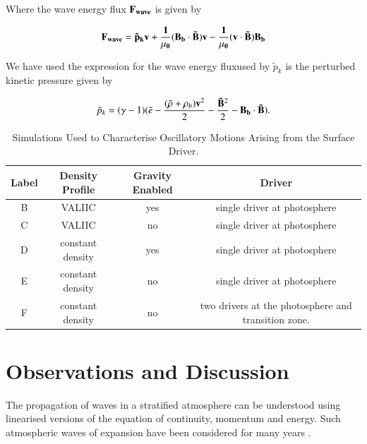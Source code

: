 \documentclass[final,1p]{elsarticle}
\begin{document}
Where the wave energy flux $\bold{F_{wave}}$ is given by

\begin{equation}\label{eqwaveenergyflux}
\bf{F_{wave}}=\tilde{p}_{k} \bf{v}+\frac{1}{\mu_{0}}(\bf{B_{b}}\cdot \bf{\tilde{B}})\bf{v}-\frac{1}{\mu_{0}}(\bf{v}\cdot\bf{\tilde{B}})\bf{B_{b}}
\end{equation}

We have used the expression for the wave energy fluxused by 
 $\tilde{p}_{k}$ is the perturbed kinetic pressure given by \cite{Bogdan2003}

\begin{equation}\label{eqperturbpk}
\tilde{p}_{k}=(\gamma - 1)( \tilde{e}-{{(\tilde{\rho} +\rho_{b})\bf v }^{2}\over{2}}-  {{\bf \tilde{B}}^{2}\over{2}}-\bf{B_{b}} \cdot  \bf{\tilde{B}}).
\end{equation}




\begin{table}
\centering
\begin{tabular}{c c c c }
\hline
Label   &  Density Profile & Gravity Enabled & Driver\\
\hline
B &  VALIIC & yes & single driver at photosphere & \\
\hline
C & VALIIC & no & single driver at photosphere &  \\
\hline
D & constant density & yes & single driver at photosphere &  \\
\hline
E & constant density & no & single driver at photosphere &  \\
\hline
F & constant density & no & two drivers at the photosphere and transition zone. &  \\
\hline
\end{tabular} 
\caption{Simulations Used to Characterise Oscillatory Motions Arising from the Surface Driver.}
\end{table}






\section{Observations and Discussion}

The propagation of waves in a stratified atmosphere can be understood using linearised versions of the equation of continuity, momentum and energy. Such atmospheric waves of expansion have been considered for many years \cite{Lamb1932}.
\end{document}
